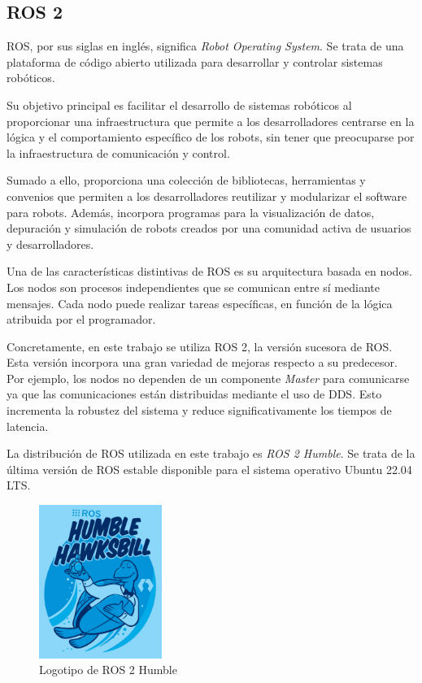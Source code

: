 \subsection{ROS 2}
\label{subsec:ros2}
\noindent ROS, por sus siglas en inglés, significa \textit{Robot Operating System}. Se trata de una plataforma de código abierto utilizada 
para desarrollar y controlar sistemas robóticos.

Su objetivo principal es facilitar el desarrollo de sistemas robóticos al proporcionar una infraestructura que permite a
los desarrolladores centrarse en la lógica y el comportamiento específico de los robots, sin tener que preocuparse por la 
infraestructura de comunicación y control. 

Sumado a ello, proporciona una colección de bibliotecas, herramientas y convenios que permiten a los desarrolladores 
reutilizar y modularizar el software para robots. Además, incorpora programas para la visualización de datos, depuración y 
simulación de robots creados por una comunidad activa de usuarios y desarrolladores.

Una de las características distintivas de ROS es su arquitectura basada en nodos. Los nodos son procesos independientes 
que se comunican entre sí mediante mensajes. Cada nodo puede realizar tareas específicas, en función de la lógica atribuida por el programador.

Concretamente, en este trabajo se utiliza ROS 2, la versión sucesora de ROS. Esta versión incorpora una gran variedad de mejoras respecto 
a su predecesor. Por ejemplo, los nodos no dependen de un componente \textit{Master} para comunicarse ya que las comunicaciones 
están distribuidas mediante el uso de \ac{DDS}. Esto incrementa la robustez del sistema y reduce significativamente los tiempos de latencia. 

La distribución de ROS utilizada en este trabajo es \textit{ROS 2 Humble}. Se trata de la última versión de ROS estable disponible para 
el sistema operativo Ubuntu 22.04 LTS.
\begin{figure} [h!]
  \begin{center}
    \includegraphics[width=4cm]{figs/ros2logo.jpeg}
  \end{center}
  \caption{Logotipo de ROS 2 Humble}
  \label{fig:ros2logo}
\end{figure}\ 

